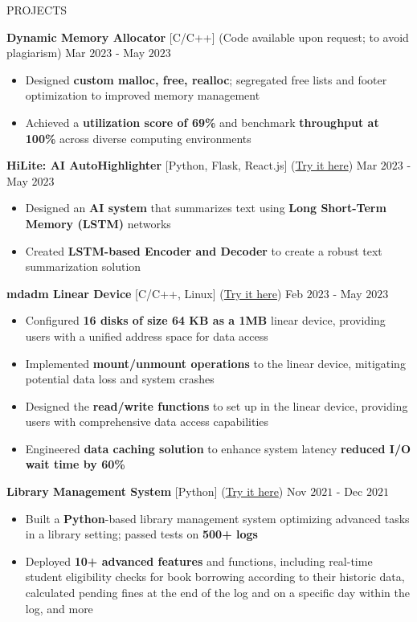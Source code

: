 \documentclass{resume} %
\begin{document}
\begin{rSection}{PROJECTS}

{\bf Dynamic Memory Allocator }{[C/C++] }{(Code available upon request; to avoid plagiarism)} \hfill Mar $2023$ - May $2023$
\begin{itemize}[itemsep = -4pt]
    \item Designed {\bf custom malloc, free, realloc}; segregated free lists and footer optimization to improved memory management
    \item Achieved a {\bf utilization score of 69\%} and benchmark {\bf throughput at 100\%} across diverse computing environments
\end{itemize}

{\bf HiLite: AI AutoHighlighter }{[Python, Flask, React.js] }{(\href{https://github.com/harshitjain17/HiLite-AIAutoHighlighter}{Try it here})} \hfill Mar $2023$ - May $2023$
\begin{itemize}[itemsep = -4pt]
    \item Designed an {\bf AI system} that summarizes text using {\bf Long Short-Term Memory (LSTM)} networks
    \item Created {\bf LSTM-based Encoder and Decoder} to create a robust text summarization solution
\end{itemize}

{\bf mdadm Linear Device }{[C/C++, Linux] }{(\href{https://github.com/harshitjain17/mdadm-Linear-Device}{Try it here})} \hfill Feb $2023$ - May $2023$
\begin{itemize}[itemsep = -4pt]
    \item Configured {\bf 16 disks of size 64 KB as a 1MB} linear device, providing users with a unified address space for data access
    \item Implemented {\bf mount/unmount operations} to the linear device, mitigating potential data loss and system crashes
    \item Designed the {\bf read/write functions} to set up in the linear device, providing users with comprehensive data access capabilities
    \item Engineered {\bf data caching solution} to enhance system latency {\bf reduced I/O wait time by 60\%}
\end{itemize}

{\bf Library Management System }{[Python] }{(\href{https://github.com/harshitjain17/Library-Management-System}{Try it here})} \hfill Nov $2021$ - Dec $2021$
\begin{itemize}[itemsep = -4pt]
    \item Built a {\bf Python}-based library management system optimizing advanced tasks in a library setting; passed tests on {\bf 500+ logs}
    \item Deployed {\bf 10+ advanced features} and functions, including real-time student eligibility checks for book borrowing according to their historic data, calculated pending fines at the end of the log and on a specific day within the log, and more
\end{itemize}

\end{rSection}
\end{document}
